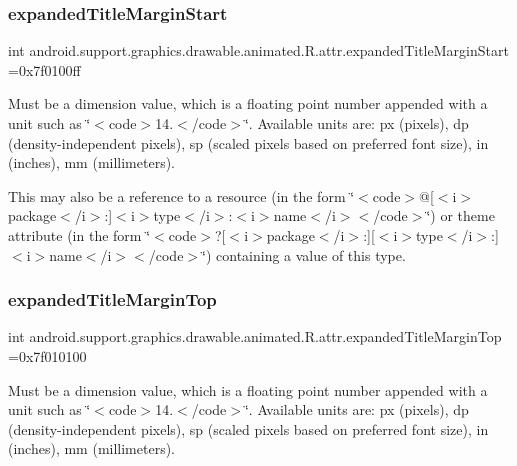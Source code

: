 \subsubsection{\texorpdfstring{expanded\+Title\+Margin\+Start}{expandedTitleMarginStart}}
{\footnotesize\ttfamily int android.\+support.\+graphics.\+drawable.\+animated.\+R.\+attr.\+expanded\+Title\+Margin\+Start =0x7f0100ff\hspace{0.3cm}{\ttfamily [static]}}

Must be a dimension value, which is a floating point number appended with a unit such as \char`\"{}$<$code$>$14.\+5sp$<$/code$>$\char`\"{}. Available units are\+: px (pixels), dp (density-\/independent pixels), sp (scaled pixels based on preferred font size), in (inches), mm (millimeters). 

This may also be a reference to a resource (in the form \char`\"{}$<$code$>$@\mbox{[}$<$i$>$package$<$/i$>$\+:\mbox{]}$<$i$>$type$<$/i$>$\+:$<$i$>$name$<$/i$>$$<$/code$>$\char`\"{}) or theme attribute (in the form \char`\"{}$<$code$>$?\mbox{[}$<$i$>$package$<$/i$>$\+:\mbox{]}\mbox{[}$<$i$>$type$<$/i$>$\+:\mbox{]}$<$i$>$name$<$/i$>$$<$/code$>$\char`\"{}) containing a value of this type. \mbox{\label{classandroid_1_1support_1_1graphics_1_1drawable_1_1animated_1_1R_1_1attr_a56f2fcfdf07c2a70468afe7a93a8ab37}} 
\subsubsection{\texorpdfstring{expanded\+Title\+Margin\+Top}{expandedTitleMarginTop}}
{\footnotesize\ttfamily int android.\+support.\+graphics.\+drawable.\+animated.\+R.\+attr.\+expanded\+Title\+Margin\+Top =0x7f010100\hspace{0.3cm}{\ttfamily [static]}}

Must be a dimension value, which is a floating point number appended with a unit such as \char`\"{}$<$code$>$14.\+5sp$<$/code$>$\char`\"{}. Available units are\+: px (pixels), dp (density-\/independent pixels), sp (scaled pixels based on preferred font size), in (inches), mm (millimeters). 

